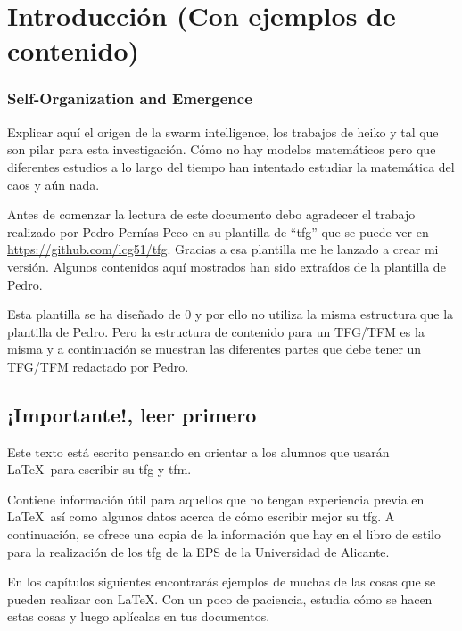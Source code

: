 
\chapter{Introducción (Con ejemplos de contenido)}


\subsection{Self-Organization and Emergence}
Explicar aquí el origen de la swarm intelligence, los trabajos de heiko y tal que son pilar para esta investigación. Cómo no hay modelos matemáticos pero que diferentes estudios a lo largo del tiempo han intentado estudiar la matemática del caos y aún nada.


Antes de comenzar la lectura de este documento debo agradecer el trabajo realizado por Pedro Pernías Peco en su plantilla de ``tfg'' que se puede ver en \url{https://github.com/lcg51/tfg}. Gracias a esa plantilla me he lanzado a crear mi versión. Algunos contenidos aquí mostrados han sido extraídos de la plantilla de Pedro. 
\\
\par Esta plantilla se ha diseñado de 0 y por ello no utiliza la misma estructura que la plantilla de Pedro. Pero la estructura de contenido para un TFG/TFM es la misma y a continuación se muestran las diferentes partes que debe tener un TFG/TFM redactado por Pedro.
\section{¡Importante!, leer primero}

Este texto está escrito pensando en orientar a los alumnos que usarán \LaTeX~para escribir su \gls{tfg} y \gls{tfm}. 
\\
\par Contiene información útil para aquellos que no tengan experiencia previa en \LaTeX~así como algunos datos acerca de cómo escribir mejor su \gls{tfg}.
A continuación, se ofrece una copia de la información que hay en el libro de estilo para la realización de los \gls{tfg} de la EPS de la Universidad de Alicante.

En los capítulos siguientes encontrarás ejemplos de muchas de las cosas que se pueden realizar con \LaTeX. Con un poco de paciencia, estudia cómo se hacen estas cosas y luego aplícalas en tus documentos.



